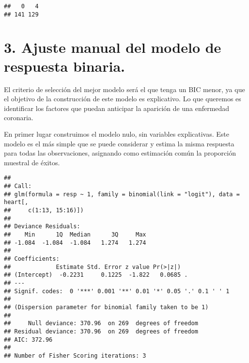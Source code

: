 \documentclass[]{article}
\newenvironment{Shaded}{\begin{snugshade}}{\end{snugshade}}
\newcommand{\KeywordTok}[1]{\textcolor[rgb]{0.13,0.29,0.53}{\textbf{#1}}}
\newcommand{\DataTypeTok}[1]{\textcolor[rgb]{0.13,0.29,0.53}{#1}}
\newcommand{\DecValTok}[1]{\textcolor[rgb]{0.00,0.00,0.81}{#1}}
\newcommand{\StringTok}[1]{\textcolor[rgb]{0.31,0.60,0.02}{#1}}
\newcommand{\CommentTok}[1]{\textcolor[rgb]{0.56,0.35,0.01}{\textit{#1}}}
\newcommand{\OperatorTok}[1]{\textcolor[rgb]{0.81,0.36,0.00}{\textbf{#1}}}
\newcommand{\NormalTok}[1]{#1}
\begin{document}
\begin{verbatim}
##   0   4 
## 141 129
\end{verbatim}

\section{3. Ajuste manual del modelo de respuesta
binaria.}\label{ajuste-manual-del-modelo-de-respuesta-binaria.}

El criterio de selección del mejor modelo será el que tenga un BIC
menor, ya que el objetivo de la construcción de este modelo es
explicativo. Lo que queremos es identificar los factores que puedan
anticipar la aparición de una enfermedad coronaria.

En primer lugar construimos el modelo nulo, sin variables explicativas.
Este modelo es el más simple que se puede considerar y estima la misma
respuesta para todas las observaciones, asignando como estimación común
la proporción muestral de éxitos.

\begin{Shaded}
\end{Shaded}

\begin{verbatim}
## 
## Call:
## glm(formula = resp ~ 1, family = binomial(link = "logit"), data = heart[, 
##     c(1:13, 15:16)])
## 
## Deviance Residuals: 
##    Min      1Q  Median      3Q     Max  
## -1.084  -1.084  -1.084   1.274   1.274  
## 
## Coefficients:
##             Estimate Std. Error z value Pr(>|z|)  
## (Intercept)  -0.2231     0.1225  -1.822   0.0685 .
## ---
## Signif. codes:  0 '***' 0.001 '**' 0.01 '*' 0.05 '.' 0.1 ' ' 1
## 
## (Dispersion parameter for binomial family taken to be 1)
## 
##     Null deviance: 370.96  on 269  degrees of freedom
## Residual deviance: 370.96  on 269  degrees of freedom
## AIC: 372.96
## 
## Number of Fisher Scoring iterations: 3
\end{verbatim}
\end{document}
